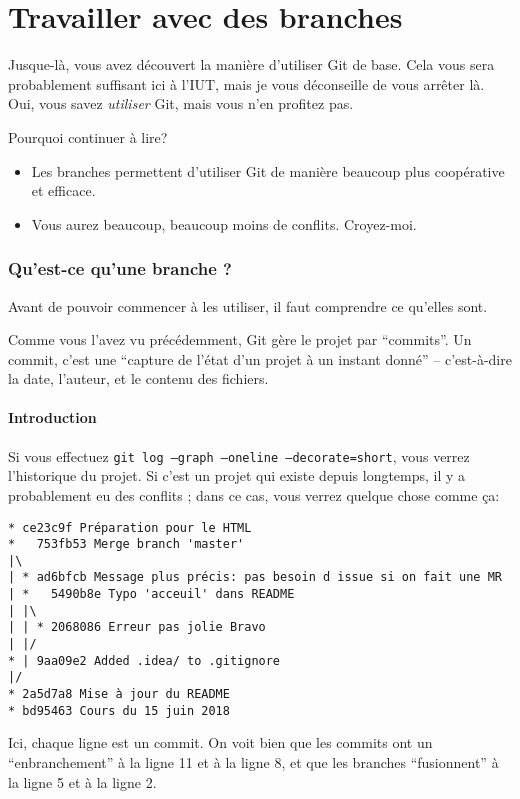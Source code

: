 \documentclass[10pt,a4paper]{article}
\begin{document}
\part{Travailler avec des branches\label{branches}}

Jusque-là, vous avez découvert la manière d'utiliser Git de base. Cela vous sera probablement suffisant ici à l'IUT, mais je vous déconseille de vous arrêter là. Oui, vous savez \textit{utiliser} Git, mais vous n'en profitez pas.

Pourquoi continuer à lire?
\begin{itemize}
\item Les branches permettent d'utiliser Git de manière beaucoup plus coopérative et efficace.
\item Vous aurez beaucoup, beaucoup moins de conflits. Croyez-moi.
\end{itemize}

\section{Qu'est-ce qu'une branche ?}

Avant de pouvoir commencer à les utiliser, il faut comprendre ce qu'elles sont.

Comme vous l'avez vu précédemment, Git gère le projet par ``commits''. Un commit, c'est une ``capture de l'état d'un projet à un instant donné'' -- c'est-à-dire la date, l'auteur, et le contenu des fichiers.

\subsection{Introduction}

Si vous effectuez \texttt{git log --graph --oneline --decorate=short}, vous verrez l'historique du projet. Si c'est un projet qui existe depuis longtemps, il y a probablement eu des conflits ; dans ce cas, vous verrez quelque chose comme ça:

\begin{verbatim}
* ce23c9f Préparation pour le HTML
*   753fb53 Merge branch 'master'
|\  
| * ad6bfcb Message plus précis: pas besoin d issue si on fait une MR
| *   5490b8e Typo 'acceuil' dans README
| |\  
| | * 2068086 Erreur pas jolie Bravo
| |/  
* | 9aa09e2 Added .idea/ to .gitignore
|/  
* 2a5d7a8 Mise à jour du README
* bd95463 Cours du 15 juin 2018
\end{verbatim}

Ici, chaque ligne est un commit. On voit bien que les commits ont un ``enbranchement'' à la ligne 11 et à la ligne 8, et que les branches ``fusionnent'' à la ligne 5 et à la ligne 2.
\end{document}
